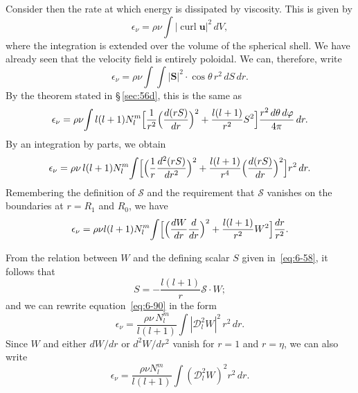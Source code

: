 Consider then the rate at which energy is dissipated by viscosity. This
is given by
\begin{equation}\label{eq:6-86}
\epsilon_\nu = \rho\nu\!\int |\operatorname{curl}\boldsymbol{u}|^2\,dV,
\end{equation}
where the integration is extended over the volume of the spherical shell.
We have already seen that the velocity field is entirely poloidal. We
can, therefore, write
\begin{equation}\label{eq:6-87}
\epsilon_\nu = \rho\nu\!\int\!\int |\mathbf{S}|^2 \cdot \cos\theta\,r^2\,dS\,dr.
\end{equation}
By the theorem stated in \S\,\ref{sec:56d}, this is the same as
\begin{equation}\label{eq:6-88}
\epsilon_\nu = \rho\nu\!\int l(l+1)N_l^m\Bigl[\frac{1}{r^2}\Bigl(\frac{d(r\mathscr{S})}{dr}\Bigr)^2 + \frac{l(l+1)}{r^2}\mathscr{S}^2\Bigr] \frac{r^2\,d\theta\,d\varphi}{4\pi}\,dr.
\end{equation}
By an integration by parts, we obtain
\begin{equation}\label{eq:6-89}
\epsilon_\nu = \rho\nu\,l(l+1)N_l^m\!\int \Bigl[\Bigl(\frac{1}{r}\frac{d^2(r\mathscr{S})}{dr^2}\Bigr)^2+\frac{l(l+1)}{r^4}\Bigl(\frac{d(r\mathscr{S})}{dr}\Bigr)^2\Bigr]r^2\,dr.
\end{equation}
Remembering the definition of $\mathscr{S}$ and the requirement that $\mathscr{S}$ vanishes
on the boundaries at $r = R_1$ and $R_0$, we have
\begin{equation}\label{eq:6-90}
\epsilon_\nu = \rho\nu l(l+1)N_l^m\!\int \Bigl[\Bigl(\frac{dW}{dr}\frac{d}{dr}\Bigr)^2 + \frac{l(l+1)}{r^2}W^2\Bigr]\frac{dr}{r^2}.
\end{equation}

From the relation between $W$ and the defining scalar $S$ given in~\eqref{eq:6-58},
it follows that
\begin{equation}\label{eq:6-91}
S = -\frac{l(l+1)}{r}\mathscr{S}\cdot W;
\end{equation}
and we can rewrite equation~\eqref{eq:6-90} in the form
\begin{equation}\label{eq:6-92}
\epsilon_\nu = \frac{\rho\nu\,N_l^m}{l(l+1)}\int |\mathscr{D}_l^2 W|^2\,r^2\,dr.
\end{equation}
Since $W$ and either $dW/dr$ or $d^2W/dr^2$ vanish for $r = 1$ and $r = \eta$, we
can also write
\begin{equation}\label{eq:6-93}
\epsilon_\nu = \frac{\rho\nu N_l^m}{l(l+1)}\int (\mathscr{D}_l^2 W)^2 r^2\,dr.
\end{equation}

